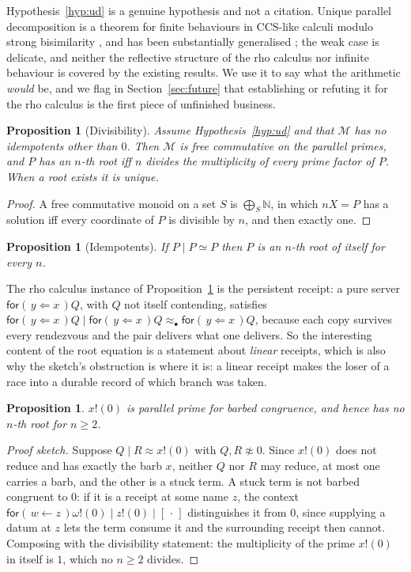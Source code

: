 \documentclass[11pt]{article}
\newtheorem{proposition}[theorem]{Proposition}
\theoremstyle{definition}
\newcommand{\rhoc}{rho calculus}
\newcommand{\In}[2]{\mathsf{for}(\,#1 \leftarrow #2\,)}
\newcommand{\Inp}[2]{\mathsf{for}(\,#1 \Leftarrow #2\,)}
\begin{document}
Hypothesis~\ref{hyp:ud} is a genuine hypothesis and not a citation. Unique parallel decomposition is a theorem for finite behaviours in CCS-like calculi modulo strong bisimilarity \cite{MilnerMoller}, and has been substantially generalised \cite{Luttik}; the weak case is delicate, and neither the reflective structure of the \rhoc{} nor infinite behaviour is covered by the existing results. We use it to say what the arithmetic \emph{would} be, and we flag in Section~\ref{sec:future} that establishing or refuting it for the \rhoc{} is the first piece of unfinished business.

\begin{proposition}[Divisibility]\label{prop:divis}
Assume Hypothesis~\ref{hyp:ud} and that $\mathcal{M}$ has no idempotents other than $0$. Then $\mathcal{M}$ is free commutative on the parallel primes, and $P$ has an $n$-th root iff $n$ divides the multiplicity of every prime factor of $P$. When a root exists it is unique.
\end{proposition}

\begin{proof}
A free commutative monoid on a set $S$ is $\bigoplus_{S} \mathbb{N}$, in which $nX = P$ has a solution iff every coordinate of $P$ is divisible by $n$, and then exactly one.
\end{proof}

\begin{proposition}[Idempotents]\label{prop:idem}
If $P \mid P \simeq P$ then $P$ is an $n$-th root of itself for every $n$.
\end{proposition}

The \rhoc{} instance of Proposition~\ref{prop:idem} is the persistent receipt: a pure server $\Inp{y}{x}Q$, with $Q$ not itself contending, satisfies $\Inp{y}{x}Q \mid \Inp{y}{x}Q \approx_{\bullet} \Inp{y}{x}Q$, because each copy survives every rendezvous and the pair delivers what one delivers. So the interesting content of the root equation is a statement about \emph{linear} receipts, which is also why the sketch's obstruction is where it is: a linear receipt makes the loser of a race into a durable record of which branch was taken.

\begin{proposition}\label{prop:atom}
$x!(0)$ is parallel prime for barbed congruence, and hence has no $n$-th root for $n \ge 2$.
\end{proposition}

\begin{proof}[Proof sketch]
Suppose $Q \mid R \approx x!(0)$ with $Q, R \not\approx 0$. Since $x!(0)$ does not reduce and has exactly the barb $x$, neither $Q$ nor $R$ may reduce, at most one carries a barb, and the other is a stuck term. A stuck term is not barbed congruent to $0$: if it is a receipt at some name $z$, the context $\In{w}{z}\omega!(0) \mid z!(0) \mid [\,\cdot\,]$ distinguishes it from $0$, since supplying a datum at $z$ lets the term consume it and the surrounding receipt then cannot. Composing with the divisibility statement: the multiplicity of the prime $x!(0)$ in itself is $1$, which no $n \ge 2$ divides.
\end{proof}
\end{document}
